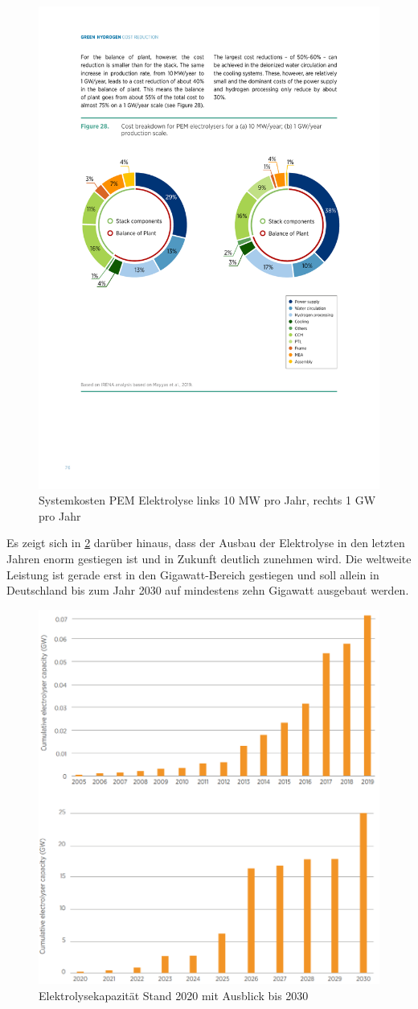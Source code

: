 \begin{figure}
	\centering
	\includegraphics[width=0.7\linewidth]{content/Grafiken/ElyCost}
	\caption[Systemkosten PEM Elektrolyse]{Systemkosten \gls{PEM} Elektrolyse links 10 MW pro Jahr, rechts 1 GW pro Jahr \cite{IRENA2020}}
	\label{fig:elycost}
\end{figure}

Es zeigt sich in \ref{fig:elycapacity} darüber hinaus, dass der Ausbau der Elektrolyse in den letzten Jahren enorm gestiegen ist  und in Zukunft deutlich zunehmen wird. Die weltweite Leistung ist gerade erst in den Gigawatt-Bereich gestiegen und soll allein in Deutschland bis zum Jahr 2030 auf mindestens zehn Gigawatt ausgebaut werden.

\begin{figure}
	\centering
	\includegraphics[width=0.7\linewidth]{content/Grafiken/Ely_Capacity}
	\caption[Elektrolyse Kapazität bis 2030]{Elektrolysekapazität Stand 2020 mit Ausblick bis 2030 \cite{IRENA2020}}
	\label{fig:elycapacity}
\end{figure}


